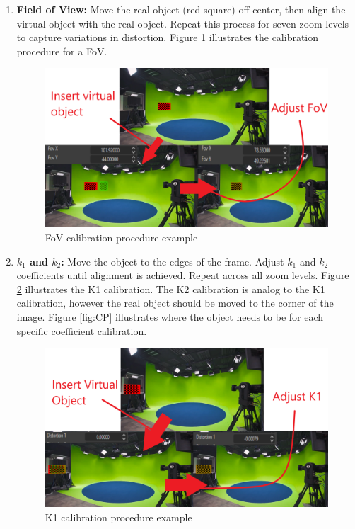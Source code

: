 \begin{enumerate}
    
    
    \item \textbf{Field of View:} Move the real object (red square) off-center, then align the virtual object with the real object. Repeat this process for seven zoom levels to capture variations in distortion. Figure \ref{fig:FoV_pro} illustrates the calibration procedure for a FoV.

    \begin{figure}[h]
    \centering
    \includegraphics[width=\textwidth]{Images/01intro/FoV_procedure.png}
    \caption{FoV calibration procedure example}
    \label{fig:FoV_pro}
    \end{figure}

    \item \textbf{\( k_1 \) and \( k_2 \):} Move the object to the edges of the frame. Adjust \( k_1 \) and \( k_2 \) coefficients until alignment is achieved. Repeat across all zoom levels. Figure \ref{fig:K1_pro} illustrates the K1 calibration. The K2 calibration is analog to the K1 calibration, however the real object should be moved to the corner of the image. Figure \ref{fig:CP} illustrates where the object needs to be for each specific coefficient calibration.

    \begin{figure}[h]
    \centering
    \includegraphics[width=\textwidth]{Images/01intro/K1_pro.png}
    \caption{K1 calibration procedure example}
    \label{fig:K1_pro}
    \end{figure}
    

\end{enumerate}
